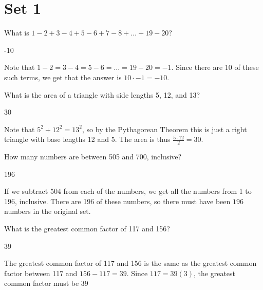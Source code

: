 \documentclass[11pt]{article}
\begin{document}
\section*{Set 1}
\begin{problem}
What is $1-2+3-4+5-6+7-8 + \dots + 19-20$?
\end{problem}

\begin{answer}
-10
\end{answer}

\begin{solution}
Note that $1-2=3-4=5-6=\dots=19-20=-1$. Since there are 10 of these such terms, we get that the answer is $10\cdot -1 = \boxed{-10}$.
\end{solution}

\begin{problem}
What is the area of a triangle with side lengths 5, 12, and 13?
\end{problem}

\begin{answer}
30
\end{answer}

\begin{solution}
Note that $5^2+12^2=13^2$, so by the Pythagorean Theorem this is just a right triangle with base lengths 12 and 5.  The area is thus $\frac{5\cdot 12}{2}=\boxed{30}$.
\end{solution}

\begin{problem}
How many numbers are between 505 and 700, inclusive?
\end{problem}

\begin{answer}
196
\end{answer}

\begin{solution}
If we subtract 504 from each of the numbers, we get all the numbers from 1 to 196, inclusive. There are 196 of these numbers, so there must have been $\boxed{196}$ numbers in the original set.
\end{solution}

\begin{problem}
What is the greatest common factor of 117 and 156?
\end{problem}

\begin{answer}
39
\end{answer}

\begin{solution}
The greatest common factor of 117 and 156 is the same as the greatest common factor between 117 and $156-117=39$. Since $117=39(3)$, the greatest common factor must be $\boxed{39}$
\end{solution}
\newpage
\end{document}
